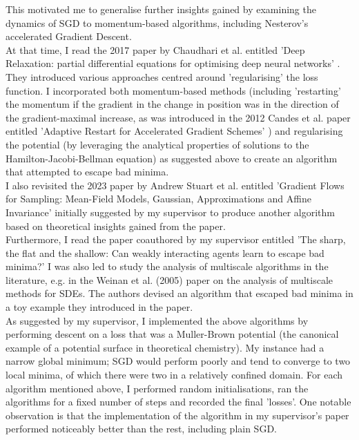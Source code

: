 \documentclass{article}
\begin{document}
This motivated me to generalise further insights gained by examining the dynamics of SGD to momentum-based algorithms, including Nesterov's accelerated Gradient Descent. \\

At that time, I read the 2017 paper by Chaudhari et al. entitled 'Deep Relaxation: partial differential equations for optimising deep neural networks' \cite{Chaudhari2017DeepRP}. They introduced various approaches centred around 'regularising' the loss function. I incorporated both momentum-based methods (including 'restarting' the momentum if the gradient in the change in position was in the direction of the gradient-maximal increase, as was introduced in the 2012 Candes et al. paper entitled 'Adaptive Restart for Accelerated Gradient Schemes' \cite{odonoghue2012adaptiverestartacceleratedgradient}) and regularising the potential (by leveraging the analytical properties of solutions to the Hamilton-Jacobi-Bellman equation) as suggested above to create an algorithm that attempted to escape bad minima.\\

I also revisited the 2023 paper by Andrew Stuart et al. entitled 'Gradient Flows for Sampling: Mean-Field Models, Gaussian, Approximations and Affine Invariance'\cite{chen2023gradientflowssamplingmeanfield} initially suggested by my supervisor to produce another algorithm based on theoretical insights gained from the paper. \\

Furthermore, I read the paper coauthored by my supervisor entitled 'The sharp, the flat and the shallow: Can weakly interacting agents learn to escape bad minima?' \cite{kantas2019sharpflatshallowweakly} I was also led to study the analysis of multiscale algorithms in the literature, e.g. in the Weinan et al. (2005) paper \cite{weinan2005multiscalesde} on the analysis of multiscale methods for SDEs. The authors devised an algorithm that escaped bad minima in a toy example they introduced in the paper. \\

As suggested by my supervisor, I implemented the above algorithms by performing descent on a loss that was a Muller-Brown potential (the canonical example of a potential surface in theoretical chemistry). My instance had a narrow global minimum; SGD would perform poorly and tend to converge to two local minima, of which there were two in a relatively confined domain. For each algorithm mentioned above, I performed random initialisations, ran the algorithms for a fixed number of steps and recorded the final 'losses'. One notable observation is that the implementation of the algorithm in my supervisor’s paper performed noticeably better than the rest, including plain SGD.\\
\end{document}
